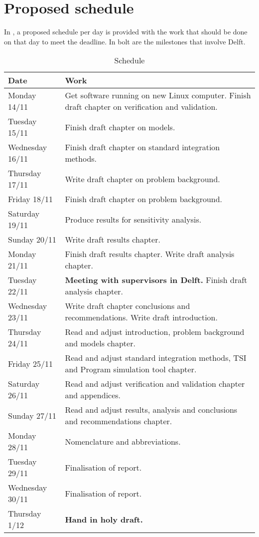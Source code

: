 \chapter{Proposed schedule} 				
\label{app:appendixS-proposedSchedule}
In , a proposed schedule per day is provided with the work that should be done on that day to meet the deadline. In bolt are the milestones that involve Delft.

\begin{table}[!ht]
\begin{center}
\caption{Schedule}
\label{tab:scheduleDay}
\begin{tabular}{|l|p{10cm}|}
\hline 
\textbf{Date} & \textbf{Work}  \\ \hline 
\hline
Monday 14/11 	& Get software running on new Linux computer. Finish draft chapter on verification and validation. \\ \hline
Tuesday 15/11 	& Finish draft chapter on models. \\ \hline
Wednesday 16/11 & Finish draft chapter on standard integration methods. \\ \hline
Thursday 17/11 	& Write draft chapter on problem background. \\ \hline
Friday 18/11 	& Finish draft chapter on problem background. \\ \hline
Saturday 19/11 	& Produce results for sensitivity analysis. \\ \hline
Sunday 20/11 	& Write draft results chapter. \\ \hline
\hline
Monday 21/11 	& Finish draft results chapter. Write draft analysis chapter. \\ \hline
Tuesday 22/11 	& \textbf{Meeting with supervisors in Delft.} Finish draft analysis chapter. \\ \hline
Wednesday 23/11 & Write draft chapter conclusions and recommendations. Write draft introduction. \\ \hline
Thursday 24/11 	& Read and adjust introduction, problem background and models chapter. \\ \hline
Friday 25/11 	& Read and adjust standard integration methods, \ac{TSI} and Program simulation tool chapter.   \\ \hline
Saturday 26/11 	& Read and adjust verification and validation chapter and appendices. \\ \hline
Sunday 27/11 	& Read and adjust results, analysis and conclusions and recommendations chapter. \\ \hline
\hline
Monday 28/11 	& Nomenclature and abbreviations. \\ \hline
Tuesday 29/11 	& Finalisation of report. \\ \hline
Wednesday 30/11 & Finalisation of report. \\ \hline
Thursday 1/12 	& \textbf{Hand in holy draft.} \\ \hline

 
\end{tabular}
\end{center}
\end{table}

